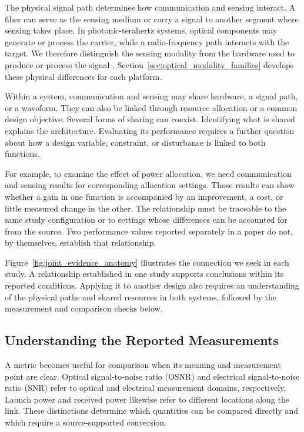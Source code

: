 The physical signal path determines how communication and sensing interact.
A fiber can serve as the sensing medium or carry a signal to another segment
where sensing takes place. In photonic-terahertz systems, optical components
may generate or process the carrier, while a radio-frequency path interacts
with the target. We therefore distinguish the sensing modality from the
hardware used to produce or process the signal
\cite{OISAC_SCR00220,OISAC_SCR00940,OISAC_SCR00196,OISAC_SCR00083,
OISAC_SCR00366}. Section~\ref{sec:optical_modality_families} develops these
physical differences for each platform.

Within a system, communication and sensing may share hardware, a signal path,
or a waveform. They can also be linked through resource allocation or a common
design objective. Several forms of sharing can coexist. Identifying what is
shared explains the architecture. Evaluating its performance requires a
further question about how a design variable, constraint, or disturbance is
linked to both functions.

For example, to examine the effect of power allocation, we need communication
and sensing results for corresponding allocation settings. Those results can
show whether a gain in one function is accompanied by an improvement, a cost,
or little measured change in the other. The relationship must be traceable
to the same study configuration or to settings whose differences can be
accounted for from the source. Two performance values reported separately in a
paper do not, by themselves, establish that relationship.

Figure~\ref{fig:joint_evidence_anatomy} illustrates the connection we seek in
each study. A relationship established in one study supports conclusions
within its reported conditions. Applying it to another design also requires
an understanding of the physical paths and shared resources in both systems,
followed by the measurement and comparison checks below.

\subsection{Understanding the Reported Measurements}

A metric becomes useful for comparison when its meaning and measurement
point are clear. Optical signal-to-noise ratio (OSNR) and electrical
signal-to-noise ratio (SNR) refer to optical and electrical measurement
domains, respectively.
Launch power and received power likewise refer to different locations along
the link. These distinctions determine which quantities can be compared
directly and which require a source-supported conversion.

